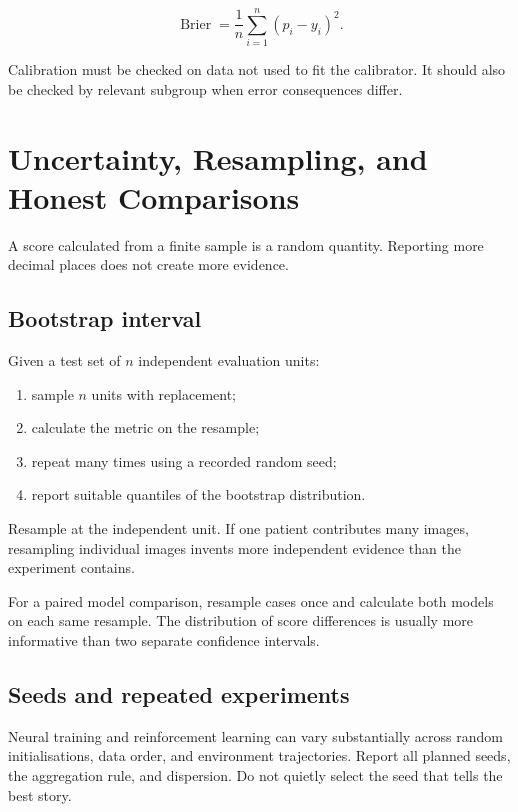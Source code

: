 \begin{equation}
    \operatorname{Brier} = \frac{1}{n}\sum_{i=1}^{n}(p_i-y_i)^2.
    \label{eq:brier-score}
\end{equation}

Calibration must be checked on data not used to fit the calibrator.
It should also be checked by relevant subgroup when error consequences differ.

\section{Uncertainty, Resampling, and Honest Comparisons}

A score calculated from a finite sample is a random quantity.
Reporting more decimal places does not create more evidence.

\subsection{Bootstrap interval}

Given a test set of $n$ independent evaluation units:

\begin{enumerate}
    \item sample $n$ units with replacement;
    \item calculate the metric on the resample;
    \item repeat many times using a recorded random seed;
    \item report suitable quantiles of the bootstrap distribution.
\end{enumerate}

Resample at the independent unit.
If one patient contributes many images, resampling individual images invents
more independent evidence than the experiment contains.

\begin{engineernote}
For a paired model comparison, resample cases once and calculate both models
on each same resample.
The distribution of score differences is usually more informative than two
separate confidence intervals.
\end{engineernote}

\subsection{Seeds and repeated experiments}

Neural training and reinforcement learning can vary substantially across
random initialisations, data order, and environment trajectories.
Report all planned seeds, the aggregation rule, and dispersion.
Do not quietly select the seed that tells the best story.

